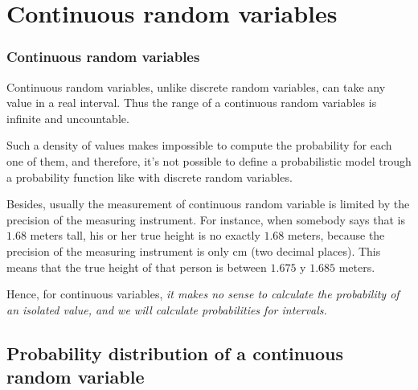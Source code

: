 \section{Continuous random variables}



\begin{frame}
\frametitle{Continuous random variables}
Continuous random variables, unlike discrete random variables, can take any value in a real interval. 
Thus the range of a continuous random variables is infinite and uncountable. 

Such a density of values makes impossible to compute the probability for each one of them, and therefore, it's not possible to define a probabilistic model trough a probability function like with discrete random variables.

Besides, usually the measurement of continuous random variable is limited by the precision of the measuring instrument.
For instance, when somebody says that is $1.68$ meters tall, his or her true height is no exactly $1.68$ meters, because the precision of the measuring instrument is only cm (two decimal places). 
This means that the true height of that person is between $1.675$ y $1.685$ meters.

Hence, for continuous variables, \alert{\emph{it makes no sense to calculate the probability of an isolated value, and we will calculate probabilities for intervals.}}
\end{frame}


\subsection{Probability distribution of a continuous random variable}

